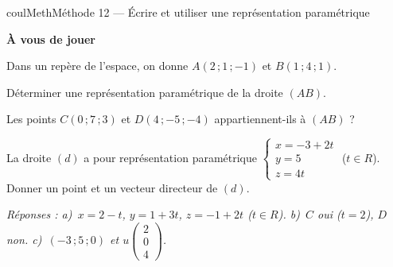 \documentclass[11pt,a4paper]{article}
\makeatletter
\newcommand{\R}{\mathbb{R}}
\newcommand{\N}{\mathbb{N}}
\newcommand{\Z}{\mathbb{Z}}
\newcommand{\Q}{\mathbb{Q}}
\newcommand{\vect}[1]{\overrightarrow{#1}}
\newcommand{\fois}[1]{\times{\color{coulExo}#1}}
\providecommand{\Cf}{\mathcal{C}\sb{f}}%
\providecommand{\Cg}{\mathcal{C}\sb{g}}%
\newcounter{lycee@signet}
\newcommand{\signet}[3][]{\stepcounter{lycee@signet}%
  \edef\lycee@dest{\if\relax\detokenize{#1}\relax
    signet.\arabic{lycee@signet}\else#1\fi}%
  \hypertarget{\lycee@dest}{}\bookmark[level=#2,dest=\lycee@dest]{#3}}
\def\R{R}\def\N{N}\def\Z{Z}\def\Q{Q}\def\vect#1{#1}\def\Cf{Cf}\def\Cg{Cg}\def\fois#1{×#1}%
\newcounter{methode}
\newenvironment{methodebox}[1][Méthode]{\stepcounter{methode}%
  \begin{boitecours}[phantom={\signet[methode-\arabic{methode}]{2}{#1}}]{coulMeth}{#1}}%
  {\end{boitecours}}
\newcommand{\etape}[1]{\par\smallskip\textbf{\color{coulMeth}#1}\par\nobreak\smallskip}
\newcommand{\reponse}[1]{\par\smallskip
  {\footnotesize\itshape\color{black!55}Réponses : #1}}
\makeatother
\begin{document}
\begin{methodebox}[Méthode 12 --- Écrire et utiliser une représentation paramétrique]
\etape{À vous de jouer}
Dans un repère de l'espace, on donne $A(2\,;1\,;-1)$ et $B(1\,;4\,;1)$.
\begin{questions}[label=\alph*)]
  \item Déterminer une représentation paramétrique de la droite $(AB)$.
  \item Les points $C(0\,;7\,;3)$ et $D(4\,;-5\,;-4)$ appartiennent-ils à $(AB)$ ?
  \item La droite $(d)$ a pour représentation paramétrique
        $\left\{\begin{array}{l} x=-3+2t\\ y=5\\ z=4t\end{array}\right.$ ($t\in\R$).
        Donner un point et un vecteur directeur de $(d)$.
\end{questions}
\reponse{a)~$x=2-t$, $y=1+3t$, $z=-1+2t$ ($t\in\R$).\; b)~$C$ oui ($t=2$), $D$ non.\;
c)~$(-3\,;5\,;0)$ et $\vect{u}\begin{pmatrix}2\\0\\4\end{pmatrix}$.}
\end{methodebox}
\end{document}

